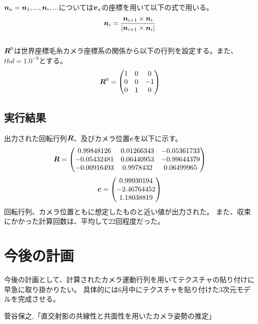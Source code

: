 \documentclass[]{jarticle}          %
\begin{document}
$\mbox{\boldmath $n$}_a={\mbox{\boldmath $n$}_1,...,\mbox{\boldmath $n$}_i,...}$については$\mbox{\boldmath $v$}_a$の座標を用いて以下の式で用いる。
\begin{equation}
  \mbox{\boldmath $n$}_i = \frac{\mbox{\boldmath $n$}_{i+1}\times{\mbox{\boldmath $n$}_{i}}}{|\mbox{\boldmath $n$}_{i+1}\times{\mbox{\boldmath $n$}_{i}}|}
\end{equation}
\\
$\mbox{\boldmath $R$}^0$は世界座標毛糸カメラ座標系の関係から以下の行列を設定する。また、$thd=1.0^{-8}$とする。
\begin{equation}
  \mbox{\boldmath $R$}^0 = 
  \begin{pmatrix}
    1 & 0 & 0 \\
    0 & 0 & -1 \\
    0 & 1 & 0 \\
  \end{pmatrix}
\end{equation}
\subsection{実行結果}
出力された回転行列$\mbox{\boldmath $R$}$、及びカメラ位置$\mbox{\boldmath $c$}$を以下に示す。
\begin{equation}
  \mbox{\boldmath $R$} =
  \begin{pmatrix}
    0.99848126 & 0.01266343 & -0.05361733 \\
    -0.05432481 &  0.06440953 & -0.99644379 \\
    -0.00916493 & 0.9978432 & 0.06499965 \\
  \end{pmatrix}
\end{equation}
\begin{equation}
  \mbox{\boldmath $c$} =
  \begin{pmatrix}
    0.99930194 \\
    -2.46764452 \\
    1.18038819 \\
  \end{pmatrix}
\end{equation}
回転行列、カメラ位置ともに想定したものと近い値が出力された。
また、収束にかかった計算回数は、平均して22回程度だった。

\section{今後の計画}
今後の計画として、計算されたカメラ運動行列を用いてテクスチャの貼り付けに早急に取り掛かりたい。
具体的には6月中にテクスチャを貼り付けた3次元モデルを完成させる。

\begin{thebibliography}{99}
 菅谷保之,「直交射影の共線性と共面性を用いたカメラ姿勢の推定」
\end{thebibliography}
\end{document}
